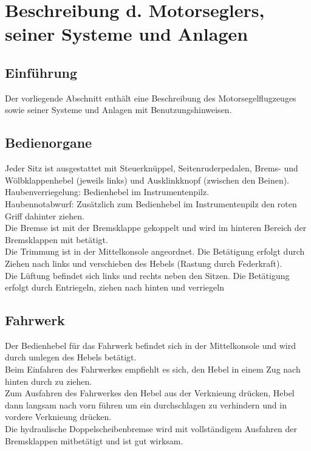 \chapter{Beschreibung d. Motorseglers, seiner Systeme und Anlagen}

\section{Einführung}
Der vorliegende Abschnitt enthält eine Beschreibung des Motorsegelflugzeuges sowie seiner Systeme und Anlagen mit Benutzungshinweisen. 

\section{Bedienorgane}
Jeder Sitz ist ausgestattet mit Steuerknüppel, Seitenruderpedalen, Brems- und Wölbklappenhebel (jeweils links) und Ausklinkknopf (zwischen den Beinen).\\
Haubenverriegelung: Bedienhebel im Instrumentenpilz.\\
Haubennotabwurf: Zusätzlich zum Bedienhebel im Instrumentenpilz den roten Griff dahinter ziehen.\\
Die Bremse ist mit der Bremsklappe gekoppelt und wird im hinteren Bereich der Bremsklappen mit betätigt.\\
Die Trimmung ist in der Mittelkonsole angeordnet. Die Betätigung erfolgt durch Ziehen nach links und verschieben des Hebels (Rastung durch Federkraft).\\
Die Lüftung befindet sich links und rechts neben den Sitzen. Die Betätigung erfolgt durch Entriegeln,  ziehen nach hinten und verriegeln\\


\section{Fahrwerk}
Der Bedienhebel für das Fahrwerk befindet sich in der Mittelkonsole und wird durch umlegen des Hebels betätigt.\\
Beim Einfahren des Fahrwerkes empfiehlt es sich, den Hebel in einem Zug nach hinten durch zu ziehen.\\
Zum Ausfahren des Fahrwerkes den Hebel aus der Verknieung drücken, Hebel dann langsam nach vorn führen um ein durchschlagen zu verhindern und in vordere Verknieung drücken.\\
Die hydraulische Doppelscheibenbremse wird mit vollständigem Ausfahren der Bremsklappen mitbetätigt und ist gut wirksam.


